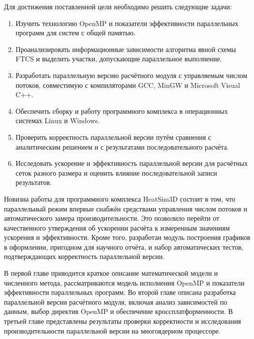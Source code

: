 Для достижения поставленной цели необходимо решить следующие задачи:
\begin{enumerate}[label=\arabic*.]
    \item Изучить технологию OpenMP и показатели эффективности параллельных программ для систем с общей памятью.
    \item Проанализировать информационные зависимости алгоритма явной схемы FTCS и выделить участки, допускающие параллельное выполнение.
    \item Разработать параллельную версию расчётного модуля с управляемым числом потоков, совместимую с компиляторами GCC, MinGW и Microsoft Visual C++.
    \item Обеспечить сборку и работу программного комплекса в операционных системах Linux и Windows.
    \item Проверить корректность параллельной версии путём сравнения с аналитическим решением и с результатами последовательного расчёта.
    \item Исследовать ускорение и эффективность параллельной версии для расчётных сеток разного размера и оценить влияние последовательной записи результатов.
\end{enumerate}

Новизна работы для программного комплекса HeatSim3D состоит в том, что параллельный режим впервые снабжён средствами управления числом потоков и автоматического замера производительности. Это позволило перейти от качественного утверждения об ускорении расчёта к измеренным значениям ускорения и эффективности. Кроме того, разработан модуль построения графиков в оформлении, пригодном для научного отчёта, и набор автоматических тестов, подтверждающих корректность параллельной версии.

В первой главе приводится краткое описание математической модели и численного метода, рассматриваются модель исполнения OpenMP и показатели эффективности параллельных программ. Во второй главе описана разработка параллельной версии расчётного модуля, включая анализ зависимостей по данным, выбор директив OpenMP и обеспечение кроссплатформенности. В третьей главе представлены результаты проверки корректности и исследования производительности параллельной версии на многоядерном процессоре.
